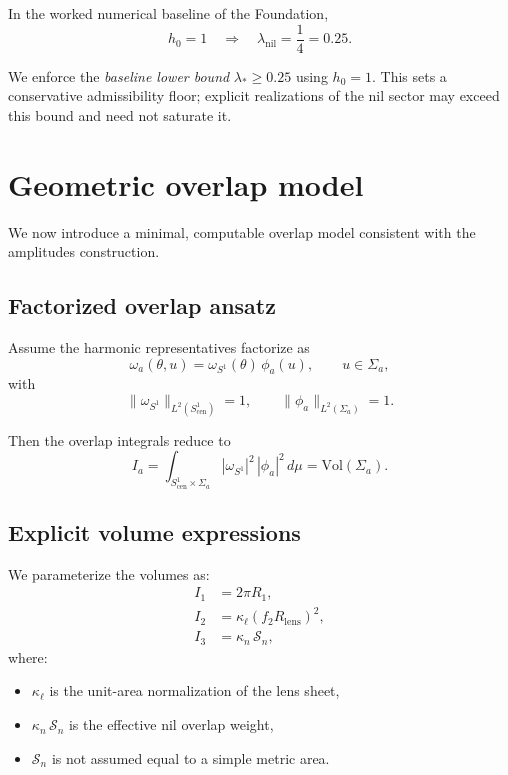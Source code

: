 \documentclass[11pt]{article}
\begin{document}
In the worked numerical baseline of the Foundation,
\begin{equation}
h_0 = 1
\quad\Rightarrow\quad
\lambda_{\mathrm{nil}} = \frac{1}{4} = 0.25.
\end{equation}

We enforce the \emph{baseline lower bound} $\lambda_{\ast}\ge 0.25$ using $h_0=1$.
This sets a conservative admissibility floor; explicit realizations of the nil sector may
exceed this bound and need not saturate it.


\section{Geometric overlap model}

We now introduce a minimal, computable overlap model consistent with
the amplitudes construction.

\subsection{Factorized overlap ansatz}

Assume the harmonic representatives factorize as
\[
\omega_a(\theta,u) = \omega_{S^1}(\theta)\,\phi_a(u),
\qquad u\in\Sigma_a,
\]
with
\[
\|\omega_{S^1}\|_{L^2(S^1_{\mathrm{cen}})} = 1,
\qquad
\|\phi_a\|_{L^2(\Sigma_a)} = 1.
\]

Then the overlap integrals reduce to
\begin{equation}
I_a = \int_{S^1_{\mathrm{cen}}\times\Sigma_a}
|\omega_{S^1}|^2\,|\phi_a|^2\,d\mu
= \mathrm{Vol}(\Sigma_a).
\label{eq:IasVolume}
\end{equation}

\subsection{Explicit volume expressions}

We parameterize the volumes as:
\begin{align}
I_1 &= 2\pi R_1,
\label{eq:I1}\\
I_2 &= \kappa_\ell (f_2R_{\mathrm{lens}})^2,
\label{eq:I2}\\
I_3 &= \kappa_n\,\mathcal{S}_n,
\label{eq:I3}
\end{align}
where:
\begin{itemize}
\item $\kappa_\ell$ is the unit-area normalization of the lens sheet,
\item $\kappa_n\,\mathcal{S}_n$ is the effective nil overlap weight,
\item $\mathcal{S}_n$ is not assumed equal to a simple metric area.
\end{itemize}
\end{document}
